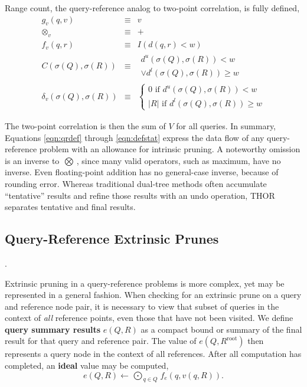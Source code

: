 \documentclass[twoside,leqno,twocolumn]{article}
\newcommand{\summary}{\delta}
\newcommand{\mysub}[1]{\subsection{#1}. }
\newcommand{\defterm}[1]{{\bf #1}}
\newcommand{\kdroot}[1]{#1^{\text{root}}}
\newcommand{\lo}[1]{#1^{l}}
\newcommand{\up}[1]{#1^{u}}
\newcommand{\distlo}{\lo{d}}
\newcommand{\distup}{\up{d}}
\newcommand{\dist}[2]{d(#1,#2)}
\newcommand{\nameOp}[2]{\mathop{#1\nolimits\!\!_{#2}}}
\newcommand{\nameop}[2]{#1_{\!#2}}
\newcommand{\myOp}[1]{\nameOp{\bigotimes}{#1}}
\newcommand{\myop}[1]{\nameop{\otimes}{#1}}
\newcommand{\letterqr}{v}
\newcommand{\outqr}{V}
\newcommand{\inqr}{v}
\newcommand{\Opqr}{\myOp{\letterqr}}
\newcommand{\opqr}{\myop{\letterqr}}
\newcommand{\fqr}{f_{\letterqr}}
\newcommand{\gqr}{g_{\letterqr}}
\newcommand{\letterqrv}{v}
\newcommand{\deltaqrv}{\summary_{\letterqrv}}
\newcommand{\canpruneqrv}{C}%
\newcommand{\lettermu}{e}
\newcommand{\inmu}{e}
\newcommand{\Outopmu}{\nameOp{\bigodot}{\lettermu}}%
\newcommand{\fmu}{f_{\lettermu}}
\newcommand{\outstat}{\sigma}
\begin{document}
\noindent
Range count, the query-reference analog to two-point correlation, is fully defined,
\begin{eqnarray*}
\gqr(q, \inqr) &\equiv& \inqr
\\
\opqr &\equiv& +
\\
\fqr(q,r) &\equiv& I(\dist{q}{r} < w)
\\
\canpruneqrv(\outstat(Q), \outstat(R))
&\equiv&
\begin{array}{l}\distup(\outstat(Q),\outstat(R)) < w \\ \vee \distlo(\outstat(Q),\outstat(R)) \geq w\end{array}
\\
\deltaqrv(\outstat(Q),\outstat(R)) &\equiv& \left\{ \begin{array}{l} 0 \text{ if } \distup(\outstat(Q),\outstat(R)) < w \\ |R| \text{ if } \distlo(\outstat(Q),\outstat(R)) \geq w \end{array}\right.
\end{eqnarray*}

\noindent
The two-point correlation is then the sum of $\outqr$ for all queries.
In summary, Equations \ref{eqn:qrdef} through \ref{eqn:defstat} express the data flow of any query-reference problem with an allowance for intrinsic pruning.
A noteworthy omission is an inverse to $\Opqr$, since many valid operators, such as maximum, have no inverse.
Even floating-point addition has no general-case inverse, because of rounding error.
Whereas traditional dual-tree methods often accumulate ``tentative'' results and refine those results with an undo operation, THOR separates tentative and final results.

\mysub{Query-Reference Extrinsic Prunes}

Extrinsic pruning in a query-reference problems is more complex, yet may be represented in a general fashion.
When checking for an extrinsic prune on a query and reference node pair, it is necessary to view that subset of queries in the context of {\em all} reference points, even those that have not been visited.
We define \defterm{query summary results} $\inmu(Q, R)$ as a compact bound or summary of the final result for that query and reference pair.
The value of $\inmu(Q, \kdroot{R})$ then represents a query node in the context of all references.
After all computation has completed, an \defterm{ideal} value may be computed,
\begin{equation*}
\inmu(Q, R) \gets \Outopmu_{q \in Q} \fmu(q, \inqr(q, R)).
\end{equation*}
\end{document}
